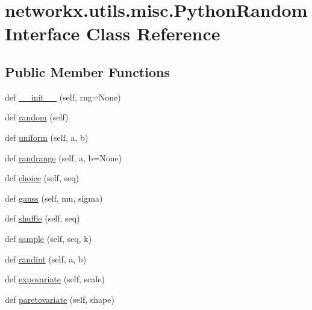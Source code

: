 \hypertarget{classnetworkx_1_1utils_1_1misc_1_1PythonRandomInterface}{}\section{networkx.\+utils.\+misc.\+Python\+Random\+Interface Class Reference}
\label{classnetworkx_1_1utils_1_1misc_1_1PythonRandomInterface}
\subsection*{Public Member Functions}
\begin{DoxyCompactItemize}
\item 
def \hyperlink{classnetworkx_1_1utils_1_1misc_1_1PythonRandomInterface_a7613293d9aa2b17e9d65ec8ae677312a}{\+\_\+\+\_\+init\+\_\+\+\_\+} (self, rng=None)
\item 
def \hyperlink{classnetworkx_1_1utils_1_1misc_1_1PythonRandomInterface_ac250152a8ad2bbfdbbe4cf748e15cf74}{random} (self)
\item 
def \hyperlink{classnetworkx_1_1utils_1_1misc_1_1PythonRandomInterface_a4a8d8e0e28851c85f4d90e3f18292dad}{uniform} (self, a, b)
\item 
def \hyperlink{classnetworkx_1_1utils_1_1misc_1_1PythonRandomInterface_a306f7d7fd00e52611ec15454a1151353}{randrange} (self, a, b=None)
\item 
def \hyperlink{classnetworkx_1_1utils_1_1misc_1_1PythonRandomInterface_a254a90e036756cc7dd41a5a0bbd1c58f}{choice} (self, seq)
\item 
def \hyperlink{classnetworkx_1_1utils_1_1misc_1_1PythonRandomInterface_acc3770bf54d2c0c31f314b6dd020f16f}{gauss} (self, mu, sigma)
\item 
def \hyperlink{classnetworkx_1_1utils_1_1misc_1_1PythonRandomInterface_a387fc381d3d873e32fffeb9ac9421370}{shuffle} (self, seq)
\item 
def \hyperlink{classnetworkx_1_1utils_1_1misc_1_1PythonRandomInterface_a34c86b706a92accc5cb8331b90749fdb}{sample} (self, seq, k)
\item 
def \hyperlink{classnetworkx_1_1utils_1_1misc_1_1PythonRandomInterface_aafa4a78c20df146d10317a71456e7deb}{randint} (self, a, b)
\item 
def \hyperlink{classnetworkx_1_1utils_1_1misc_1_1PythonRandomInterface_ad2eb8667bce5f74683c7cd988035476d}{expovariate} (self, scale)
\item 
def \hyperlink{classnetworkx_1_1utils_1_1misc_1_1PythonRandomInterface_a2122aa9c9f8e2e9675ed6159cf18aaaf}{paretovariate} (self, shape)
\end{DoxyCompactItemize}


